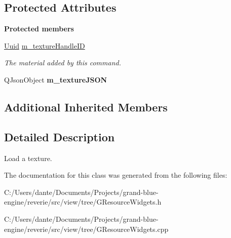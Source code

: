 \subsection*{Protected Attributes}
\begin{Indent}\textbf{ Protected members}\par
\begin{DoxyCompactItemize}
\item 
\mbox{\label{classrev_1_1_delete_texture_command_aa6ff5b80971f63ff7a70e43a75da4fcd}} 
\mbox{\hyperlink{classrev_1_1_uuid}{Uuid}} \mbox{\hyperlink{classrev_1_1_delete_texture_command_aa6ff5b80971f63ff7a70e43a75da4fcd}{m\+\_\+texture\+Handle\+ID}}
\begin{DoxyCompactList}\small\item\em The material added by this command. \end{DoxyCompactList}\item 
\mbox{\label{classrev_1_1_delete_texture_command_a87e2d664afa13cebb61423e43d7597fc}} 
Q\+Json\+Object {\bfseries m\+\_\+texture\+J\+S\+ON}
\end{DoxyCompactItemize}
\end{Indent}
\subsection*{Additional Inherited Members}


\subsection{Detailed Description}
Load a texture. 

The documentation for this class was generated from the following files\+:\begin{DoxyCompactItemize}
\item 
C\+:/\+Users/dante/\+Documents/\+Projects/grand-\/blue-\/engine/reverie/src/view/tree/G\+Resource\+Widgets.\+h\item 
C\+:/\+Users/dante/\+Documents/\+Projects/grand-\/blue-\/engine/reverie/src/view/tree/G\+Resource\+Widgets.\+cpp\end{DoxyCompactItemize}
